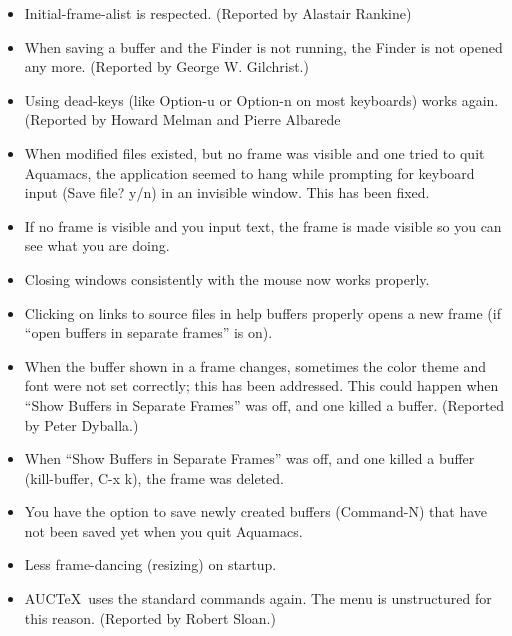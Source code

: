 \begin{itemize}

\item Initial-frame-alist is respected. (Reported by Alastair Rankine)


\item When saving a buffer and the Finder is not running,
        the Finder is not opened any more. (Reported by George W. Gilchrist.)

\item Using dead-keys (like Option-u or Option-n on most
        keyboards) works again. (Reported by Howard Melman and Pierre Albarede
\item When modified files existed, but no frame was visible and
    one tried to quit Aquamacs, the application seemed to hang while
    prompting for keyboard input (Save file? y/n) in an invisible
    window. This has been fixed.

\item If no frame is visible and you input text, the frame is  made
    visible so you can see what you are doing.

\item Closing windows consistently with the mouse now works properly.

\item Clicking on links to source files in help buffers properly
    opens a new frame (if ``open buffers in separate frames'' is on).

\item When the buffer shown in a frame changes, sometimes the
    color theme and font were not set correctly; this has been addressed. This could happen when
    ``Show Buffers in Separate Frames'' was off, and one killed a
    buffer. (Reported by Peter Dyballa.)

\item When ``Show Buffers in Separate Frames'' was off, and one killed a
    buffer (kill-buffer, C-x k), the frame was deleted.

\item You have the option to save newly created buffers (Command-N)
    that have not been saved yet when you quit Aquamacs.

\item Less frame-dancing (resizing) on startup.

\item AUC\TeX\ uses the standard commands again. The menu is
  unstructured for this reason. (Reported by Robert Sloan.)


\end{itemize}
